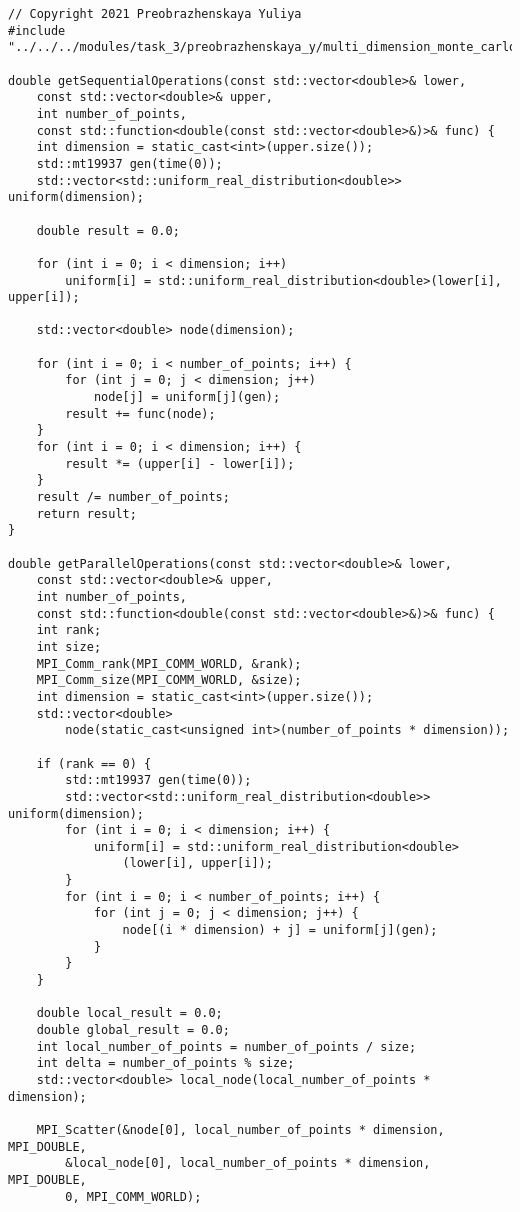 \documentclass{report}
\begin{document}
\begin{lstlisting}
// Copyright 2021 Preobrazhenskaya Yuliya
#include "../../../modules/task_3/preobrazhenskaya_y/multi_dimension_monte_carlo.h"

double getSequentialOperations(const std::vector<double>& lower,
    const std::vector<double>& upper,
    int number_of_points,
    const std::function<double(const std::vector<double>&)>& func) {
    int dimension = static_cast<int>(upper.size());
    std::mt19937 gen(time(0));
    std::vector<std::uniform_real_distribution<double>> uniform(dimension);

    double result = 0.0;

    for (int i = 0; i < dimension; i++)
        uniform[i] = std::uniform_real_distribution<double>(lower[i], upper[i]);

    std::vector<double> node(dimension);

    for (int i = 0; i < number_of_points; i++) {
        for (int j = 0; j < dimension; j++)
            node[j] = uniform[j](gen);
        result += func(node);
    }
    for (int i = 0; i < dimension; i++) {
        result *= (upper[i] - lower[i]);
    }
    result /= number_of_points;
    return result;
}

double getParallelOperations(const std::vector<double>& lower,
    const std::vector<double>& upper,
    int number_of_points,
    const std::function<double(const std::vector<double>&)>& func) {
    int rank;
    int size;
    MPI_Comm_rank(MPI_COMM_WORLD, &rank);
    MPI_Comm_size(MPI_COMM_WORLD, &size);
    int dimension = static_cast<int>(upper.size());
    std::vector<double>
        node(static_cast<unsigned int>(number_of_points * dimension));

    if (rank == 0) {
        std::mt19937 gen(time(0));
        std::vector<std::uniform_real_distribution<double>> uniform(dimension);
        for (int i = 0; i < dimension; i++) {
            uniform[i] = std::uniform_real_distribution<double>
                (lower[i], upper[i]);
        }
        for (int i = 0; i < number_of_points; i++) {
            for (int j = 0; j < dimension; j++) {
                node[(i * dimension) + j] = uniform[j](gen);
            }
        }
    }

    double local_result = 0.0;
    double global_result = 0.0;
    int local_number_of_points = number_of_points / size;
    int delta = number_of_points % size;
    std::vector<double> local_node(local_number_of_points * dimension);

    MPI_Scatter(&node[0], local_number_of_points * dimension, MPI_DOUBLE,
        &local_node[0], local_number_of_points * dimension, MPI_DOUBLE,
        0, MPI_COMM_WORLD);


\end{lstlisting}
\end{document}
